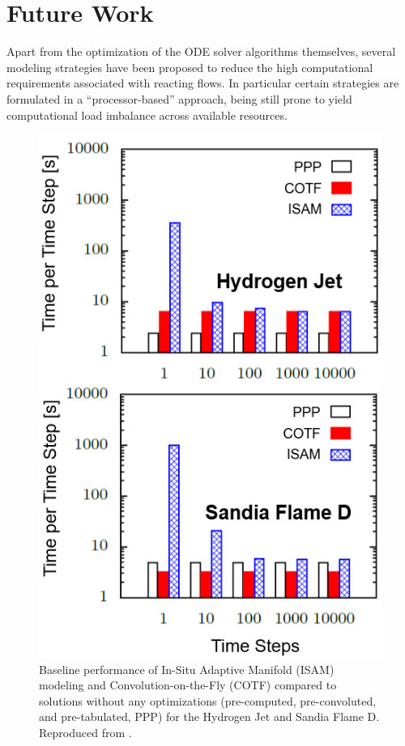 \documentclass[letterpaper,twocolumn,10pt]{article}
\begin{document}
\section{Future Work}
Apart from the optimization of the ODE solver algorithms themselves, several modeling strategies have been proposed to reduce the high computational requirements associated with reacting flows. In particular certain strategies are formulated in a ``processor-based'' approach, being still prone to yield computational load imbalance across available resources.

\begin{figure}[h!]
    \centering
    \includegraphics[width=\linewidth]{Figures/ISAT.PNG}
    \caption{Baseline performance of In-Situ Adaptive Manifold (ISAM) modeling and Convolution-on-the-Fly (COTF) compared to solutions without any optimizations (pre-computed, pre-convoluted, and pre-tabulated, PPP) for the Hydrogen Jet and Sandia Flame D. Reproduced from \cite{LACEY2021}.}
    \label{fig:ISAT}
\end{figure}
\end{document}

